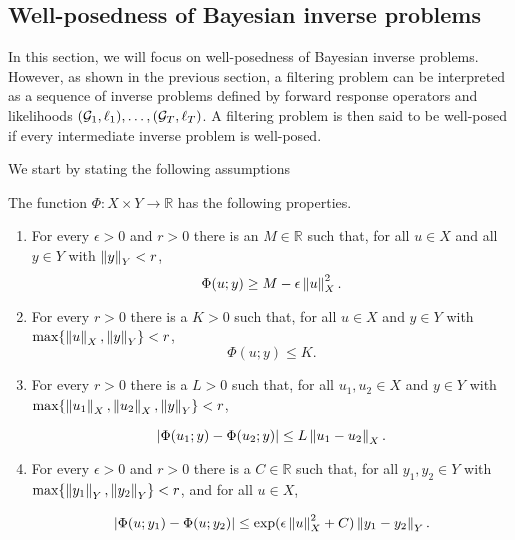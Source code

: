 \subsection{Well-posedness of Bayesian inverse problems}

In this section, we will focus on well-posedness of Bayesian inverse problems. However, as shown in the previous section, a filtering problem can be interpreted as a sequence of inverse problems defined by forward response operators and likelihoods $(\mathcal{G}_1, \ell_1), \ldots, (\mathcal{G}_T, \ell_T)$. A filtering problem is then said to be well-posed if every intermediate inverse problem is well-posed.

We start by stating the following assumptions

\begin{assumption}\label{assumption-ll}
  The function $\Phi : X \times Y \rightarrow \mathbb{R}$ has the following properties.
  
  \begin{enumerate}
  \item For every $\epsilon > 0$ and $r > 0$ there is an $M \in \mathbb{R}$ such that, for all $u \in X$ and all $y \in Y$ with $\left\lVert y\right\rVert_Y < r$,
    \begin{equation*}
      \Phi(u; y) \ge M - \epsilon\left\lVert u\right\rVert_X^2.
    \end{equation*}
  \item For every $r > 0$ there is a $K > 0$ such that, for all $u \in X$ and $y \in Y$ with $\text{max}\{\left\lVert u\right\rVert_X, \left\lVert y\right\rVert_Y\} < r$,
    \begin{equation*}
      \Phi(u; y) \le K.
    \end{equation*}

  \item For every $r > 0$ there is a $L > 0$ such that, for all $u_1, u_2 \in X$ and $y \in Y$ with $\text{max}\{\left\lVert u_1\right\rVert_X, \left\lVert u_2\right\rVert_X, \left\lVert y\right\rVert_Y\} < r$,

    \begin{equation*}
      |\Phi(u_1; y) - \Phi(u_2; y)| \le L\left\lVert u_1 - u_2\right\rVert_X.
    \end{equation*}

  \item For every $\epsilon > 0$ and $r > 0$ there is a $C \in \mathbb{R}$ such that, for all $y_1, y_2 \in Y$ with $\text{max}\{\left\lVert y_1\right\rVert_Y, \left\lVert y_2\right\rVert_Y\} < r$, and for all $u \in X$,

    \begin{equation*}
      |\Phi(u; y_1) - \Phi(u; y_2)| \le \exp(\epsilon\left\lVert u\right\rVert_X^2 + C)\left\lVert y_1 - y_2\right\rVert_Y.
    \end{equation*}
  \end{enumerate}
\end{assumption}

